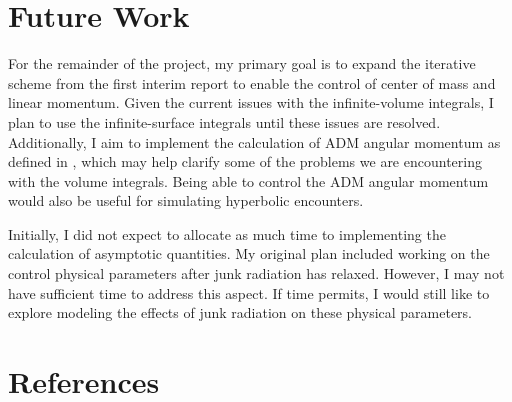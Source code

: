 \documentclass{../document}
\begin{document}
	\section{Future Work}
    For the remainder of the project, my primary goal is to expand the iterative scheme from the first interim report to enable the control of center of mass and linear momentum. Given the current issues with the infinite-volume integrals, I plan to use the infinite-surface integrals until these issues are resolved. Additionally, I aim to implement the calculation of ADM angular momentum as defined in \cite{Serguei}, which may help clarify some of the problems we are encountering with the volume integrals. Being able to control the ADM angular momentum would also be useful for simulating hyperbolic encounters.

    Initially, I did not expect to allocate as much time to implementing the calculation of asymptotic quantities. My original plan included working on the control physical parameters after junk radiation has relaxed. However, I may not have sufficient time to address this aspect. If time permits, I would still like to explore modeling the effects of junk radiation on these physical parameters.

	\section*{References}
  	\printbibliography[heading=none]
\end{document}
